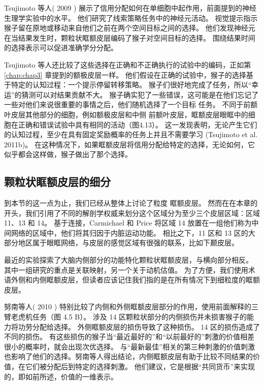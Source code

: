 Tsujimoto 等人( 2009 ) 展示了信用分配如何在单细胞中起作用，前面提到的神经生理学实验中的水平。
他们研究了线索策略任务中的神经元活动。
视觉提示指示猴子留在原地或移动来自他们之前在两个空间目标之间的选择。
他们发现神经元在当结果发生时，颗粒状眶额皮层编码了猴子对空间目标的选择。
围绕结果时间的选择表示可以促进准确学分分配。\par


Tsujimoto 等人还比较了这些选择在正确和不正确执行的试验中的编码，正如第 \ref{chap:chap3} 章提到的额极皮层一样。
他们假设在正确的试验中，猴子的选择基于特定的认知过程：一个提示停留转移策略。
猴子们很好地完成了任务，所以“幸运”的猜测可以对结果贡献不大。
猴子确实犯了一些错误，这可能是在他们忘记了一些对他们来说很重要的事情之后，他们随机选择了一个目标
任务。
不同于前额叶皮层其他部分的细胞，例如额极皮层和中侧 前额叶皮层，眶额皮层眼眶中的细胞在正确和错误试验中具有相同的活动（图4.13）。
这一发现表明，无论产生它们的认知过程，至少在具有固定奖励概率的任务上并且不需要学习 (Tsujimoto et al. 2011b)。
在这种情况下，如果眶额皮层将信用分配给特定的选择，无论如何，它似乎都会这样做，猴子做出了那个选择。\par



\subsection{颗粒状眶额皮层的细分}

到本节的这一点为止，我们已经从整体上讨论了粒度 眶额皮层。
然而在在本章的开头，我们引用了不同的解剖学权威来划分这个区域分为至少三个皮层区域：区域 11、13 和 14。
基于连接，Carmichael 和 Price 将区域 14 放置在一组他们称为中间网络的区域中，他们将其归因于内脏运动功能。
相比之下，11 区和 13 区的大部分地区属于眼眶网络，与皮层的感觉区域有很强的联系，比如下颞皮层。\par


最近的实验探索了大脑内侧部分的功能特化颗粒状眶额皮层，与横向部分相反。
其中一组研究的重点是关联映射，另一个关于动机估值。
为了方便，我们使用术语外侧和内侧眶额皮层，但读者应该记住我们指的是在所有情况下到细粒度的眶额皮层。\par


努南等人( 2010 ) 特别比较了内侧和外侧眶额皮层部分的作用，使用前面解释的三臂老虎机任务（图 4.5 B）。
涉及 14 区颗粒状部分的内侧损伤并未损害猴子的能力将功劳分配给选择。
外侧眶额皮层的损伤导致了这种损伤。
14 区的损伤造成了不同的损伤。
有这些损伤的猴子当“最近最好的”和“以前最好的”刺激的价值相差很小的概率时，就会出现次优选择。
与“最新最佳”相关的第三种刺激的价值刺激也影响了他们的选择。努南等人得出结论，内侧眶额皮层有助于比较不同结果的价值，在它们被分配后到特定的选择刺激。
他们建议，它是根据“共同货币”来实现的，即如前所述，价值的一维表示。\par


